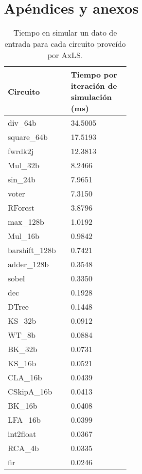 \chapter{Apéndices y anexos}

\begin{table}[ht]
  \centering
  \caption{Tiempo en simular un dato de entrada para cada circuito proveído por AxLS.}
  \label{tab:timing_info}
  \begin{tabular}{M{0.2\linewidth}M{0.3\linewidth}}
    \toprule
    Circuito & Tiempo por iteración de simulación (\si{\milli\second}) \\
    \midrule
    div\_64b &        34.5005      \\
    square\_64b &      17.5193      \\
    fwrdk2j &          12.3813      \\
    Mul\_32b &        8.2466      \\
    sin\_24b &        7.9651      \\
    voter &            7.3150      \\
    RForest &          3.8796      \\
    max\_128b &        1.0192      \\
    Mul\_16b &        0.9842      \\
    barshift\_128b &  0.7421      \\
    adder\_128b &      0.3548      \\
    sobel &            0.3350      \\
    dec &              0.1928      \\
    DTree &            0.1448      \\
    KS\_32b &          0.0912      \\
    WT\_8b &          0.0884      \\
    BK\_32b &          0.0731      \\
    KS\_16b &          0.0521      \\
    CLA\_16b &        0.0439      \\
    CSkipA\_16b &      0.0413      \\
    BK\_16b &          0.0408      \\
    LFA\_16b &        0.0399      \\
    int2float &        0.0367      \\
    RCA\_4b &          0.0335      \\
    fir &              0.0246      \\
    \bottomrule
  \end{tabular}
\end{table}
